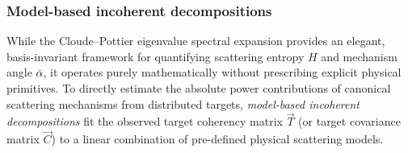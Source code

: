 \subsubsection{Model-based incoherent decompositions}
\label{sec:model-based-decompositions}

While the Cloude--Pottier eigenvalue spectral expansion provides an elegant, basis-invariant framework for quantifying scattering entropy $H$ and mechanism angle $\bar{\alpha}$, it operates purely mathematically without prescribing explicit physical primitives.
To directly estimate the absolute power contributions of canonical scattering mechanisms from distributed targets, \emph{model-based incoherent decompositions} fit the observed target coherency matrix $\vec T$ (or target covariance matrix $\vec C$) to a linear combination of pre-defined physical scattering models.

